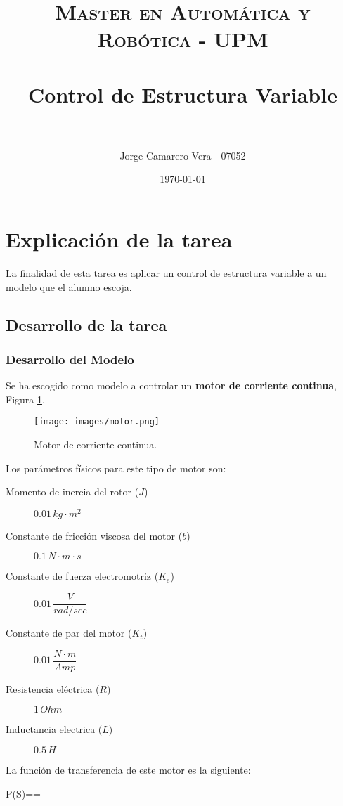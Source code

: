 \documentclass[a4paper, fontsize=11pt]{scrartcl} %
\title{	
	\normalfont \normalsize 
	\textsc{Master en Automática y Robótica - UPM} \\ [25pt] %
	\horrule{0.5pt} \\[0.4cm] %
	\huge Control de Estructura Variable \\ %
	\horrule{2pt} \\[0.5cm] %
}
\author{Jorge Camarero Vera - 07052} %
\date{\normalsize\today} %
\numberwithin{equation}{section} %
\numberwithin{figure}{section} %
\numberwithin{table}{section} %
\newenvironment{myalign}{\par\nobreak\large\noindent\align}{\endalign} %
\begin{document}
	\maketitle
	
	\section{Explicación de la tarea}
	
	La finalidad de esta tarea es aplicar un control de estructura variable a un modelo que el alumno escoja.
	
	\subsection{Desarrollo de la tarea}
	
	\subsubsection{Desarrollo del Modelo}
	
	Se ha escogido como modelo a controlar un \textbf{motor de corriente continua}, Figura \ref{Motor}.
	
	\begin{figure}[h!]
		\centering
		\texttt{[image: images/motor.png]}
		\caption{Motor de corriente continua.}
		\label{Motor}
	\end{figure}
	\FloatBarrier
	Los parámetros físicos para este tipo de motor son:
	\begin{description}
	\item[Momento de inercia del rotor ($J$)] $0.01\,kg\cdot m^2$
	\item[Constante de fricción viscosa del motor ($b$)] $0.1\,N\cdot m\cdot s$
	\item[Constante de fuerza electromotriz ($K_e$)] $0.01\,\dfrac{V}{rad/sec}$
	\item[Constante de par del motor ($K_t$)] $0.01\,\dfrac{N\cdot m }{Amp}$
	\item[Resistencia eléctrica ($R$)] $1\,Ohm$
	\item[Inductancia electrica ($L$)] $0.5\,H$
	\end{description}
	
	La función de transferencia de este motor es la siguiente:
	
	\begin{myalign}
	P(S)== \qquad  {}
	\end{myalign}
	
\end{document}
